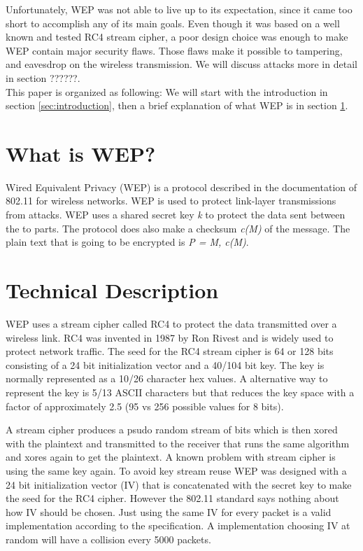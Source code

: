 \documentclass[twocolumn]{IEEEtran}
\begin{document}
Unfortunately, WEP was not able to live up to its expectation, since it came too short to
accomplish any of its main goals. Even though it was based on a well known and tested RC4 
stream cipher, a poor design choice was enough to make WEP contain major security flaws. Those
flaws make it possible to tampering, and eavesdrop on the wireless transmission. We will 
discuss attacks more in detail in section ??????. \\



This paper is organized as following: We will start with the introduction in 
section \ref{sec:introduction}, then a brief explanation of what WEP is in 
section \ref{sec:whatiswep}. 


\section {What is WEP?}
\label{sec:whatiswep}

Wired Equivalent Privacy (WEP) is a protocol described in the documentation of 802.11 for 
wireless networks. WEP is used to protect link-layer transmissions from attacks. WEP uses a 
shared secret key \emph{k} to protect the data sent between the to parts. The protocol does also
make a checksum \emph{c(M)} of the message. The plain text that is going to be encrypted is 
\emph{P = M, c(M)}. 



\section {Technical Description}
\label{sec:technical_description}

WEP uses a stream cipher called RC4 to protect the data transmitted over a wireless link. RC4 was invented in 1987 by Ron Rivest and is widely used to protect network traffic. The seed for the RC4 stream cipher is 64 or 128 bits consisting of a 24 bit initialization vector and a 40/104 bit key. The key is normally represented as a 10/26 character hex values. A alternative way to represent the key is 5/13 ASCII characters but that reduces the key space with a factor of approximately 2.5 (95 vs 256 possible values for 8 bits).

A stream cipher produces a psudo random stream of bits which is then xored with the plaintext and transmitted to the receiver that runs the same algorithm and xores again to get the plaintext. A known problem with stream cipher is using the same key again. To avoid key stream reuse WEP was designed with a 24 bit initialization vector (IV) that is concatenated with the secret key to make the seed for the RC4 cipher. However the 802.11 standard says nothing about how IV should be chosen. Just using the same IV for every packet is a valid implementation according to the specification. A implementation choosing IV at random will have a collision every 5000 packets\cite{Borisov:New}. 
\end{document}
